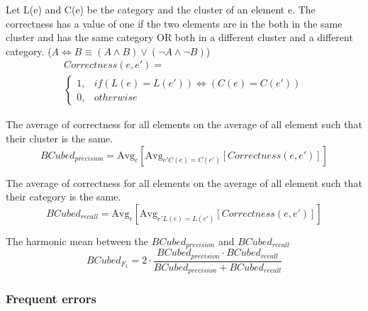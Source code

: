\begin{definition}
  Let L(e) and C(e) be the category and the cluster of an element e.
  The correctness has a value of one if the two elements are in the both in the same cluster and has the same category OR both in a different cluster and a different category. ($A \Longleftrightarrow B \equiv (A \land B) \lor (\neg A \land \neg B)$)
  \begin{gather*}
    Correctness(e, e') = \\
    \begin{cases}
      1, & if (L(e) = L(e')) \Longleftrightarrow (C(e) = C(e'))\\
      0, & otherwise
    \end{cases}
  \end{gather*}
\end{definition}

\begin{definition}
  The average of correctness for all elements on the average of all element such that their cluster is the same.
  \begin{equation}
    BCubed_{precision} = \text{Avg}_{e}[\text{Avg}_{e' C(e)=C(e')}[Correctness(e, e')]]
  \end{equation}
\end{definition}

\begin{definition}
  The average of correctness for all elements on the average of all element such that their category is the same.
  \begin{equation}
    BCubed_{recall} = \text{Avg}_{e}[\text{Avg}_{e' L(e)=L(e')}[Correctness(e, e')]]
  \end{equation}
\end{definition}

\begin{definition}
  The harmonic mean between the $BCubed_{precision}$ and $BCubed_{recall}$
  \begin{equation}
    BCubed_{F_1} =
    2 \cdot \frac{BCubed_{precision} \cdot BCubed_{recall}}
    {BCubed_{precision} + BCubed_{recall}}
  \end{equation}
\end{definition}


\subsubsection{Frequent errors}

